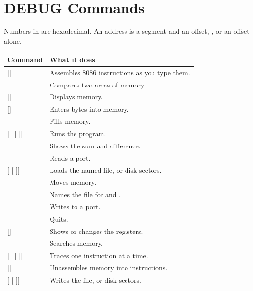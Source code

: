 \section{DEBUG Commands}

Numbers in  are hexadecimal. An address is a segment and an
offset, , or an offset alone.

\begin{tabularx}{\textwidth}{@{}P{1.85in}X@{}}
\toprule
\textbf{Command} & \textbf{What it does}\\
\midrule
{} [] & Assembles 8086 instructions as you type them.\\
   & Compares two areas of memory.\\
 [] & Displays memory.\\
  [] & Enters bytes into memory.\\
   & Fills memory.\\
 [=] [] & Runs the program.\\
   & Shows the sum and difference.\\
  & Reads a port.\\
 [ [  ]] & Loads the named file, or disk sectors.\\
   & Moves memory.\\
  & Names the file for  and .\\
   & Writes to a port.\\
 & Quits.\\
 [] & Shows or changes the registers.\\
   & Searches memory.\\
 [=] [] & Traces one instruction at a time.\\
 [] & Unassembles memory into instructions.\\
 [ [  ]] & Writes the file, or disk sectors.\\
\bottomrule
\end{tabularx}


